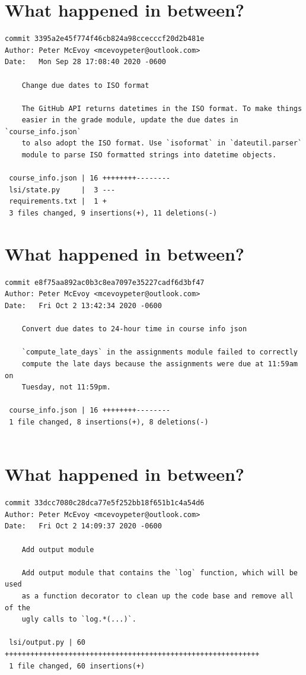 \documentclass{article}
\begin{document}
\newpage


\section*{What happened in between?}
\vspace{2ex}
\begin{verbatim}
commit 3395a2e45f774f46cb824a98ccecccf20d2b481e
Author: Peter McEvoy <mcevoypeter@outlook.com>
Date:   Mon Sep 28 17:08:40 2020 -0600

    Change due dates to ISO format
    
    The GitHub API returns datetimes in the ISO format. To make things
    easier in the grade module, update the due dates in `course_info.json`
    to also adopt the ISO format. Use `isoformat` in `dateutil.parser`
    module to parse ISO formatted strings into datetime objects.

 course_info.json | 16 ++++++++--------
 lsi/state.py     |  3 ---
 requirements.txt |  1 +
 3 files changed, 9 insertions(+), 11 deletions(-)
\end{verbatim}

\newpage

\section*{What happened in between?}
\vspace{2ex}
\begin{verbatim}
commit e8f75aa892ac0b3c8ea7097e35227cadf6d3bf47
Author: Peter McEvoy <mcevoypeter@outlook.com>
Date:   Fri Oct 2 13:42:34 2020 -0600

    Convert due dates to 24-hour time in course info json
    
    `compute_late_days` in the assignments module failed to correctly
    compute the late days because the assignments were due at 11:59am on
    Tuesday, not 11:59pm.

 course_info.json | 16 ++++++++--------
 1 file changed, 8 insertions(+), 8 deletions(-)


\end{verbatim}

\newpage

\section*{What happened in between?}
\vspace{2ex}
\begin{verbatim}
commit 33dcc7080c28dca77e5f252bb18f651b1c4a54d6
Author: Peter McEvoy <mcevoypeter@outlook.com>
Date:   Fri Oct 2 14:09:37 2020 -0600

    Add output module
    
    Add output module that contains the `log` function, which will be used
    as a function decorator to clean up the code base and remove all of the
    ugly calls to `log.*(...)`.

 lsi/output.py | 60 ++++++++++++++++++++++++++++++++++++++++++++++++++++++++++++
 1 file changed, 60 insertions(+)

\end{verbatim}
\end{document}

